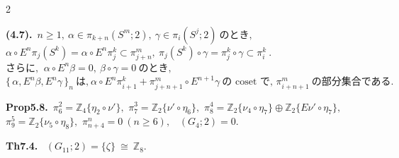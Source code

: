 \documentclass[10pt, leqno]{ltjsarticle}
\newcommand{\todai}[2][]{\{\,#2\,\}_{#1}}      %
\newcommand{\gen}[1]{\{#1\}}       %
\newcommand{\pis}[2]{\pi_{#1}(#2)}       %
\newcommand{\pit}[2]{\pi_{#1}^{#2}}
\numberwithin{equation}{section}
\theoremstyle{plain}
\theoremstyle{definition}
\theoremstyle{remark}
\begin{document}
\begin{paracol}{2}
\switchcolumn

\noindent
\textbf{(4.7).}\
\(n\ge1, \ \alpha\in\pis{k+n}{S^m; 2},\ \gamma\in\pis{i}{S^j; 2}
\ \text{のとき, }\)\\
\(\alpha\circ E^n\pis{j}{S^k} = \alpha\circ E^n \pit{j}{k}
\subset \pit{j+n}{m},
\ \pis{j}{S^k}\circ\gamma = \pit{j}{k}\circ\gamma \subset\pit{i}{k}\ . \)\\
\(\text{さらに, }\ \alpha\circ E^n\beta=0,\ \beta\circ\gamma = 0 \ \text{のとき, }\)\\
\(\todai[n]{\alpha, E^n\beta, E^n\gamma}\ \text{は,}\
\alpha\circ E^n\pit{i+1}{k} + \pit{j+n+1}{m}\circ E^{n+1}\gamma\
\text{の coset で, }\pit{i+n+1}{m} \ \text{の部分集合である. }\)

\noindent
\textbf{Prop5.8.}\
\(\pi^{2}_{6}=\mathbb Z_4\gen{\eta_{2}\circ\nu'},\) \quad
\(\pi^{3}_{7}=\mathbb Z_2\gen{\nu'\circ\eta_6},\) \quad
\(\pi^{4}_{8}=\mathbb Z_2\gen{\nu_{4}\circ\eta_7}\oplus \mathbb Z_2\gen{E\nu'\circ\eta_7},\) \\
\(\pi^{5}_{9}=\mathbb Z_2\gen{\nu_{5}\circ\eta_8},\) \quad
\(\pi^{n}_{n+4}=0\ (n\ge6),\) \
\((G_{4};2)=0.\)

\noindent
\textbf{Th7.4.}\
\((G_{11};2)=\gen{\zeta}\ \cong\ \mathbb Z_{8}.\)


\end{paracol}
\end{document}
